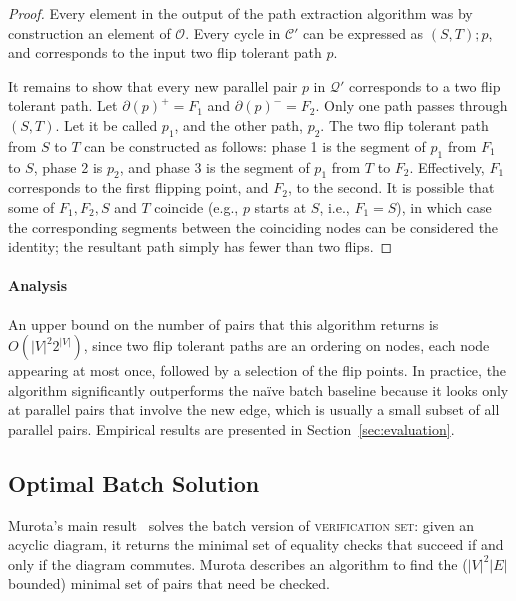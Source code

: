 \documentclass[sigplan]{acmart}
\begin{document}
\begin{proof}
    Every element in the output of the path extraction algorithm was by construction an element of $\mathcal{O}$. Every cycle in $\mathcal{C}'$ can be expressed as $(S, T) ; p$, and corresponds to the input two flip tolerant path $p$.
    
    It remains to show that every new parallel pair $p$ in $\mathcal{Q}'$ corresponds to a two flip tolerant path.
    Let $\partial(p)^+ = F_1$ and $\partial(p)^- = F_2$. 
    Only one path passes through $(S, T)$. Let it be called $p_1$, and the other path, $p_2$.
    The two flip tolerant path from $S$ to $T$ can be constructed as follows: phase 1 is the segment of $p_1$ from $F_1$ to $S$, phase 2 is $p_2$, and phase 3 is the segment of $p_1$ from $T$ to $F_2$.
    Effectively, $F_1$ corresponds to the first flipping point, and $F_2$, to the second.
    It is possible that some of $F_1, F_2, S$ and $T$ coincide (e.g., $p$ starts at $S$, i.e., $F_1 = S$), in which case the corresponding segments between the coinciding nodes can be considered the identity; the resultant path simply has fewer than two flips.
\end{proof}

\paragraph{Analysis}
An upper bound on the number of pairs that this algorithm returns is $O(|V|^{2} 2^{|V|})$, since two flip tolerant paths are an ordering on nodes, each node appearing at most once, followed by a selection of the flip points.
In practice, the algorithm significantly outperforms the na\"{i}ve batch baseline because it looks only at parallel pairs that involve the new edge, which is usually a small subset of all parallel pairs.
Empirical results are presented in Section~\ref{sec:evaluation}.

\subsection{Optimal Batch Solution}

\label{sec:batchBaseline}

Murota's main result~\cite{commutative} solves the batch version of \textsc{verification set}: given an acyclic diagram, it returns the minimal set of equality checks that succeed if and only if the diagram commutes.
Murota describes an algorithm to find the ($|V|^2|E|$ bounded) minimal set of pairs that need be checked.
\end{document}
